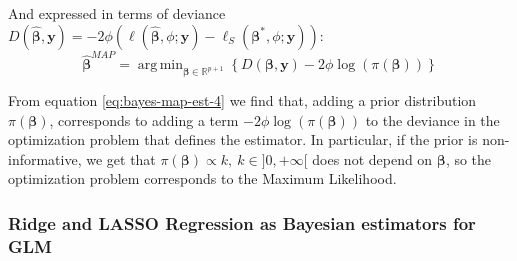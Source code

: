 \documentclass[a4paper, twoside, openright, 12pt]{report}
\DeclareMathOperator*{\argmin}{arg\,min}  %
\theoremstyle{definition}
\theoremstyle{definition}
\theoremstyle{definition}
\theoremstyle{remark}
\begin{document}
And expressed in terms of deviance \(D(\hat{\boldsymbol{\beta}}, \boldsymbol{y}) = -2\phi\left(\ell\left(\hat{\boldsymbol{\beta}}, \phi; \boldsymbol{y}\right) - \ell_{S}\left(\boldsymbol{\beta}^*, \phi; \boldsymbol{y}\right)\right)\):
\begin{equation}
\label{eq:bayes-map-est-4}
\hat{\boldsymbol{\beta}}^{MAP} =
\argmin_{\boldsymbol{\beta}\in\mathbb{R}^{p+1}}{\left\{
D(\boldsymbol{\beta}, \boldsymbol{y}) -2\phi \log{\left(\pi(\boldsymbol{\beta})\right)} \right\}}
\end{equation}

From equation \eqref{eq:bayes-map-est-4} we find that, adding a prior distribution \(\pi(\boldsymbol{\beta})\), corresponds to adding a term \(-2\phi \log{\left(\pi(\boldsymbol{\beta})\right)}\) to the deviance in the optimization problem that defines the estimator. In particular, if the prior is non-informative, we get that \(\pi(\boldsymbol{\beta})\propto k, \ k\in]0,+\infty[\) does not depend on \(\boldsymbol{\beta}\), so the optimization problem corresponds to the Maximum Likelihood.

\hypertarget{chap:bayes-ridge-lasso}{%
\subsubsection{Ridge and LASSO Regression as Bayesian estimators for GLM}\label{chap:bayes-ridge-lasso}}
\end{document}
